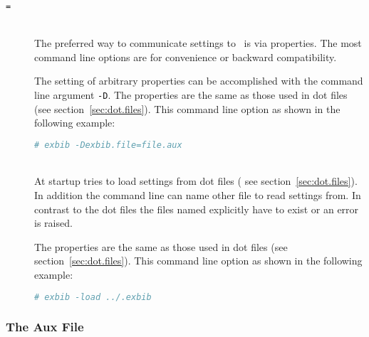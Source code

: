 \begin{description}
\item[\texttt{=}]\ \\
  
  The preferred way to communicate settings to \ExBib\ is via
  properties. The most command line options are for convenience or
  backward compatibility.
  
  The setting of arbitrary properties can be accomplished with the
  command line argument \texttt{-D}. The properties are the same as
  those used in dot files (see section~\ref{sec:dot.files}). This
  command line option as shown in the following example:

\begin{lstlisting}[language=sh]
# exbib -Dexbib.file=file.aux
\end{lstlisting}

\item[ ]\ \\
  
  At startup  tries to load settings from dot files ( see
  section~\ref{sec:dot.files}). In addition the command line can name
  other file to read settings from. In contrast to the dot files the
  files named explicitly have to exist or an error is raised.
  
  The properties are the same as those used in dot files (see
  section~\ref{sec:dot.files}). This command line option as shown in
  the following example:

\begin{lstlisting}[language=sh]
# exbib -load ../.exbib
\end{lstlisting}

\end{description}


\subsubsection{The Aux File}

